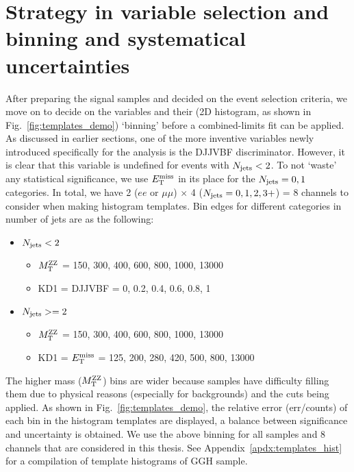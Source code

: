 \section{Strategy in variable selection and binning and systematical uncertainties}
After preparing the signal samples and decided on the event selection criteria, we move on to
decide on the variables and their (2D histogram, as shown in Fig.~\ref{fig:templates_demo}) `binning' before a combined-limits
fit can be applied. As discussed in earlier sections, one of the more inventive variables
newly introduced specifically for the analysis is the DJJVBF discriminator. However, it is
clear that this variable is undefined for events with $N_\mathrm{jets} < 2$. To
not `waste' any statistical significance, we use $E_{\mathrm{T}}^{\mathrm{miss}}$ in its place for the
$N_\mathrm{jets} = 0,1$ categories. In total, we have 2 ($ee$ or $\mu\mu$) $\times$ 4 ($N_\mathrm{jets} = 0,1,2,3+$) = 8
channels to consider when making histogram templates.
Bin edges for different categories in number of jets are as the following:
\begin{itemize} 
    \item $N_\mathrm{jets} < 2$
        \begin{itemize} 
            \item $M_\mathrm{T}^{\mathrm{ZZ}}$ = 150, 300, 400, 600, 800, 1000, 13000
            \item KD1 = DJJVBF = 0, 0.2, 0.4, 0.6, 0.8, 1
        \end{itemize}
    \item $N_\mathrm{jets} >= 2$
        \begin{itemize} 
            \item $M_\mathrm{T}^{\mathrm{ZZ}}$ = 150, 300, 400, 600, 800, 1000, 13000
            \item KD1 = $E_{\mathrm{T}}^{\mathrm{miss}}$ = 125, 200, 280, 420, 500, 800, 13000
        \end{itemize}
\end{itemize}
The higher mass ($M_\mathrm{T}^{\mathrm{ZZ}}$) bins are wider because samples
have difficulty filling them due to physical reasons (especially for backgrounds) 
and the cuts being applied. As shown in Fig.~\ref{fig:templates_demo}, the relative error (err/counts) of each
bin in the histogram templates are displayed, a balance between significance and uncertainty is
obtained. We use the above binning for all samples and 8 channels that are considered in this
thesis. See Appendix~\ref{apdx:templates_hist} for a compilation of template histograms of GGH sample.

